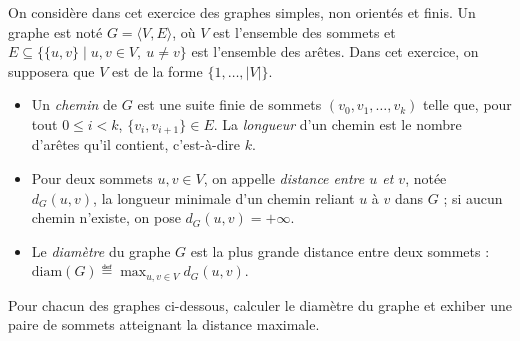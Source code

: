
\begingroup


\begin{exercice}

  On considère dans cet exercice des graphes simples, non orientés et finis.
  Un graphe est noté $G=\langle V, E\rangle$, où $V$ est l'ensemble des sommets et
  $E\subseteq \{\{u,v\}\mid u,v\in V,\ u\neq v\}$ est l'ensemble des arêtes.
  Dans cet exercice, on supposera que $V$ est de la forme $\{1,\dots,|V|\}$.
  \begin{itemize}
  \item Un \emph{chemin} de $G$ est une suite finie de sommets $(v_0, v_1, \dots, v_k)$ telle que,
    pour tout $0\le i<k$, $\{v_i,v_{i+1}\}\in E$.
    La \emph{longueur} d'un chemin est le nombre d'arêtes qu'il contient, c'est-à-dire $k$.

  \item Pour deux sommets $u,v\in V$, on appelle \emph{distance entre $u$ et $v$}, notée $d_G(u,v)$,
    la longueur minimale d'un chemin reliant $u$ à $v$ dans $G$ ; si aucun chemin n'existe, on pose $d_G(u,v)=+\infty$.

  \item Le \emph{diamètre} du graphe $G$ est la plus grande distance entre deux sommets : 
    $\mathrm{diam}(G) \eqdef \max_{u,v\in V} d_G(u,v)$.
  \end{itemize}
  
  \begin{questions}
  \item Pour chacun des graphes ci-dessous, calculer le diamètre du graphe et exhiber une paire de sommets atteignant la distance maximale.
  \begin{center}
    \quad\quad\quad
\end{center}
\end{questions}
\end{exercice}
